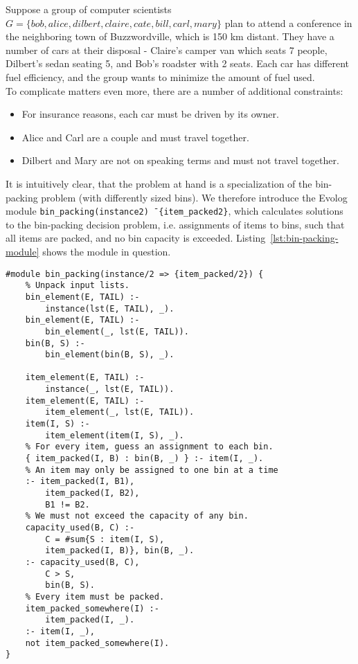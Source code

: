 \begin{example}
\label{ex:bin-packing-module}
Suppose a group of computer scientists $G = \{\mathit{bob}, \mathit{alice}, \mathit{dilbert}, \mathit{claire}, \mathit{cate}, \mathit{bill}, \mathit{carl}, \mathit{mary}\}$ plan to attend a conference in the neighboring town of Buzzwordville, which is 150 km distant. They have a number of cars at their disposal - Claire's camper van which seats 7 people, Dilbert's sedan seating 5, and Bob's roadster with 2 seats. Each car has different fuel efficiency, and the group wants to minimize the amount of fuel used.\\
To complicate matters even more, there are a number of additional constraints:
\begin{itemize}
	\item For insurance reasons, each car must be driven by its owner.
	\item Alice and Carl are a couple and must travel together.
	\item Dilbert and Mary are not on speaking terms and must not travel together.
\end{itemize}
It is intuitively clear, that the problem at hand is a specialization of the bin-packing problem (with differently sized bins). We therefore introduce the Evolog module \texttt{bin\_packing(instance\/2) \=\> \{item\_packed\/2\}}, which calculates solutions to the bin-packing decision problem, i.e. assignments of items to bins, such that all items are packed, and no bin capacity is exceeded. Listing~\ref{lst:bin-packing-module} shows the module in question.
\begin{lstlisting}[style=asp-code, label={lst:bin-packing-module}, caption={Bin-packing module}]
#module bin_packing(instance/2 => {item_packed/2}) {
	% Unpack input lists.
	bin_element(E, TAIL) :- 
		instance(lst(E, TAIL), _).
	bin_element(E, TAIL) :- 
		bin_element(_, lst(E, TAIL)).
	bin(B, S) :- 
		bin_element(bin(B, S), _).
	
	item_element(E, TAIL) :- 
		instance(_, lst(E, TAIL)).
	item_element(E, TAIL) :- 
		item_element(_, lst(E, TAIL)).
	item(I, S) :- 
		item_element(item(I, S), _).
	% For every item, guess an assignment to each bin.
	{ item_packed(I, B) : bin(B, _) } :- item(I, _).
	% An item may only be assigned to one bin at a time
	:- item_packed(I, B1), 
		item_packed(I, B2), 
		B1 != B2.
	% We must not exceed the capacity of any bin.
	capacity_used(B, C) :- 
		C = #sum{S : item(I, S), 
		item_packed(I, B)}, bin(B, _).
	:- capacity_used(B, C), 
		C > S, 
		bin(B, S).
	% Every item must be packed.
	item_packed_somewhere(I) :- 
		item_packed(I, _).
	:- item(I, _), 
	not item_packed_somewhere(I).
}	
\end{lstlisting}


\end{example}
